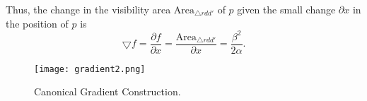 Thus, the change in the visibility area $\text{Area}_{\triangle rdd'}$ of $p$ given the small change $\partial x$ in the position of $p$ is $$\bigtriangledown f = \frac{\partial f}{\partial x} = \frac{\text{Area}_{\triangle rdd'}}{\partial x} = \frac{\beta^2}{2\alpha}.$$


    

    


\begin{figure}[h!]
    \centering
    \texttt{[image: gradient2.png]}
    \caption{Canonical Gradient Construction.}
    \label{fig:gradient}
\end{figure}




